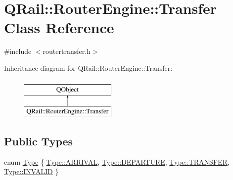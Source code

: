 \hypertarget{classQRail_1_1RouterEngine_1_1Transfer}{}\section{Q\+Rail\+::Router\+Engine\+::Transfer Class Reference}
\label{classQRail_1_1RouterEngine_1_1Transfer}


{\ttfamily \#include $<$routertransfer.\+h$>$}

Inheritance diagram for Q\+Rail\+::Router\+Engine\+::Transfer\+:\begin{figure}[H]
\begin{center}
\leavevmode
\includegraphics[height=2.000000cm]{classQRail_1_1RouterEngine_1_1Transfer}
\end{center}
\end{figure}
\subsection*{Public Types}
\begin{DoxyCompactItemize}
\item 
enum \mbox{\hyperlink{classQRail_1_1RouterEngine_1_1Transfer_a5a0b372acbdfb9381fb937bf163edfa6}{Type}} \{ \mbox{\hyperlink{classQRail_1_1RouterEngine_1_1Transfer_a5a0b372acbdfb9381fb937bf163edfa6ad5f52d91ac49fd146727f4710767dd08}{Type\+::\+A\+R\+R\+I\+V\+AL}}, 
\mbox{\hyperlink{classQRail_1_1RouterEngine_1_1Transfer_a5a0b372acbdfb9381fb937bf163edfa6ae7cc381a17e714e7ba15ef6f9858304e}{Type\+::\+D\+E\+P\+A\+R\+T\+U\+RE}}, 
\mbox{\hyperlink{classQRail_1_1RouterEngine_1_1Transfer_a5a0b372acbdfb9381fb937bf163edfa6aeb5ddb3b6096fb90ff720d9c3e2a6628}{Type\+::\+T\+R\+A\+N\+S\+F\+ER}}, 
\mbox{\hyperlink{classQRail_1_1RouterEngine_1_1Transfer_a5a0b372acbdfb9381fb937bf163edfa6accc0377a8afbf50e7094f5c23a8af223}{Type\+::\+I\+N\+V\+A\+L\+ID}}
 \}
\end{DoxyCompactItemize}

